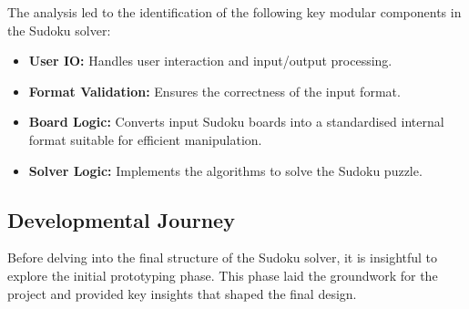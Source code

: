\documentclass[11pt]{article}
\begin{document}
The analysis led to the identification of the following key modular components in the Sudoku solver:

\begin{itemize}
\item \textbf{User IO:} Handles user interaction and input/output processing.
\item \textbf{Format Validation:} Ensures the correctness of the input format.
\item \textbf{Board Logic:} Converts input Sudoku boards into a standardised internal format suitable for efficient manipulation.
\item \textbf{Solver Logic:} Implements the algorithms to solve the Sudoku puzzle.
\end{itemize}


\subsection{Developmental Journey}
Before delving into the final structure of the Sudoku solver, it is insightful to explore the initial prototyping phase. This phase laid the groundwork for the project and provided key insights that shaped the final design.
\end{document}
